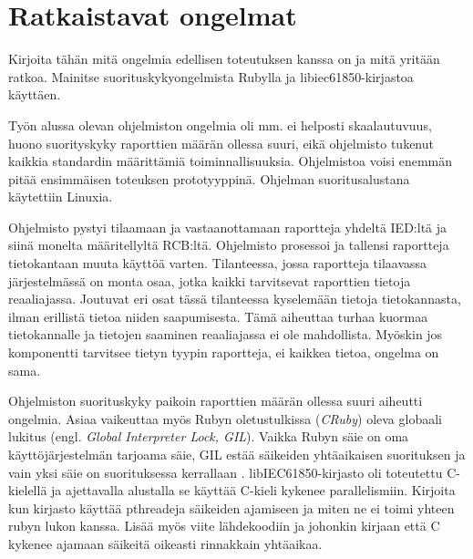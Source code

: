 \section{Ratkaistavat ongelmat}
\begin{it}
Kirjoita tähän mitä ongelmia edellisen toteutuksen kanssa on ja mitä yritään ratkoa. Mainitse suorituskykyongelmista Rubylla ja libiec61850-kirjastoa käyttäen.
\end{it}

Työn alussa olevan ohjelmiston ongelmia oli mm. ei helposti skaalautuvuus, huono suorityskyky raporttien määrän ollessa suuri, eikä ohjelmisto tukenut kaikkia standardin määrittämiä toiminnallisuuksia. Ohjelmistoa voisi enemmän pitää ensimmäisen toteuksen prototyyppinä. Ohjelman suoritusalustana käytettiin Linuxia.

Ohjelmisto pystyi tilaamaan ja vastaanottamaan raportteja yhdeltä IED:ltä ja siinä monelta määritellyltä RCB:ltä. Ohjelmisto prosessoi ja tallensi raportteja tietokantaan muuta käyttöä varten. Tilanteessa, jossa raportteja tilaavassa järjestelmässä on monta osaa, jotka kaikki tarvitsevat raporttien tietoja reaaliajassa. Joutuvat eri osat tässä tilanteessa kyselemään tietoja tietokannasta, ilman erillistä tietoa niiden saapumisesta. Tämä aiheuttaa turhaa kuormaa tietokannalle ja tietojen saaminen reaaliajassa ei ole mahdollista. Myöskin jos komponentti tarvitsee tietyn tyypin raportteja, ei kaikkea tietoa, ongelma on sama.

Ohjelmiston suorituskyky paikoin raporttien määrän ollessa suuri aiheutti ongelmia. Asiaa vaikeuttaa myös Rubyn oletustulkissa (\emph{CRuby}) oleva globaali lukitus (engl. \emph{Global Interpreter Lock, GIL}). Vaikka Rubyn säie on oma käyttöjärjestelmän tarjoama säie, GIL estää säikeiden yhtäaikaisen suorituksen ja vain yksi säie on suorituksessa kerrallaan \mbox{\cite[s.~131--133]{Odaira2014}}. libIEC61850-kirjasto oli toteutettu C-kielellä ja ajettavalla alustalla se käyttää C-kieli kykenee parallelismiin. Kirjoita kun kirjasto käyttää pthreadeja säikeiden ajamiseen ja miten ne ei toimi yhteen rubyn lukon kanssa. Lisää myös viite lähdekoodiin ja johonkin kirjaan että C kykenee ajamaan säikeitä oikeasti rinnakkain yhtäaikaa.

